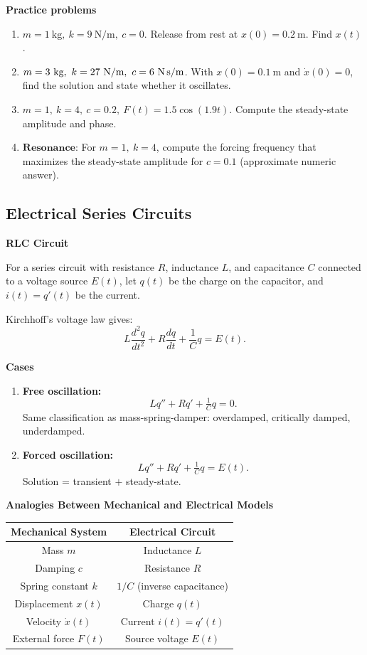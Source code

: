   \textbf{Practice problems}
    \begin{enumerate}
      \item \(m=1\ \text{kg},\ k=9\ \text{N/m},\ c=0\). Release from rest at \(x(0)=0.2\ \text{m}\). Find \(x(t)\).
      \item \(m=3\ \text{kg},\ k=27\ \text{N/m},\ c=6\ \text{N\,s/m}\). With \(x(0)=0.1\ \text{m}\) and \(\dot x(0)=0\), find the solution and state whether it oscillates.
      \item \(m=1,\ k=4,\ c=0.2,\ F(t)=1.5\cos(1.9t)\). Compute the steady-state amplitude and phase.
      \item \(\textbf{Resonance:}\) For \(m=1,\ k=4\), compute the forcing frequency that maximizes the steady-state amplitude for \(c=0.1\) (approximate numeric answer).
    \end{enumerate}




  \subsection*{Electrical Series Circuits}
    \textbf{RLC Circuit}

    For a series circuit with resistance $R$, inductance $L$, and capacitance $C$ connected to a voltage source $E(t)$, let $q(t)$ be the charge on the capacitor, and $i(t)=q'(t)$ be the current.

    Kirchhoff’s voltage law gives:
    \[
    L \frac{d^2 q}{dt^2} + R \frac{dq}{dt} + \frac{1}{C}q = E(t).
    \]

    \textbf{Cases}
      \begin{enumerate}
        \item \textbf{Free oscillation:}
        \[
        L q'' + R q' + \tfrac{1}{C}q=0.
        \]
        Same classification as mass-spring-damper: overdamped, critically damped, underdamped.

        \item \textbf{Forced oscillation:}
        \[
        L q'' + R q' + \tfrac{1}{C}q=E(t).
        \]
        Solution = transient $+$ steady-state.
      \end{enumerate}


    \textbf{Analogies Between Mechanical and Electrical Models}
    \begin{center}
      \begin{tabular}{|c|c|}
        \hline
        \textbf{Mechanical System} & \textbf{Electrical Circuit} \\
        \hline
        Mass $m$ & Inductance $L$ \\
        Damping $c$ & Resistance $R$ \\
        Spring constant $k$ & $1/C$ (inverse capacitance) \\
        Displacement $x(t)$ & Charge $q(t)$ \\
        Velocity $\dot{x}(t)$ & Current $i(t)=q'(t)$ \\
        External force $F(t)$ & Source voltage $E(t)$ \\
        \hline
      \end{tabular}
    \end{center}

